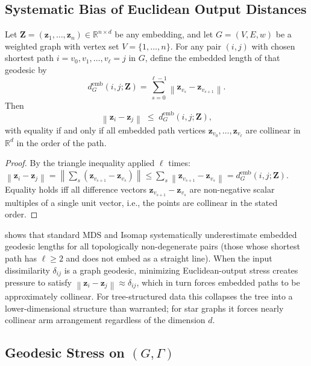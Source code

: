 \documentclass[twoside,11pt]{article}
\newcommand{\R}{\mathbb{R}}
\newcommand{\bz}{\mathbf{z}}
\newcommand{\bZ}{\mathbf{Z}}
\newcommand{\norm}[1]{\left\|#1\right\|}
\newcommand{\demb}{d^{\mathrm{emb}}}
\begin{document}
\subsection{Systematic Bias of Euclidean Output Distances}
\label{sec:systematic_bias}

\begin{proposition}
  \label{prop:bias}
  Let $\bZ = (\bz_1, \ldots, \bz_n) \in \R^{n \times d}$ be any embedding,
  and let $G = (V, E, w)$ be a weighted graph with vertex set $V = \{1,
  \ldots, n\}$.  For any pair $(i,j)$ with chosen shortest path
  $i = v_0, v_1, \ldots, v_\ell = j$ in $G$, define the embedded length of
  that geodesic by
  \begin{equation}
    \demb_G(i,j;\bZ)
    = \sum_{s=0}^{\ell-1} \norm{\bz_{v_s} - \bz_{v_{s+1}}}.
    \label{eq:emb_geo}
  \end{equation}
  Then
  \begin{equation}
    \norm{\bz_i - \bz_j} \;\leq\; \demb_G(i,j;\bZ),
    \label{eq:triangle_bias}
  \end{equation}
  with equality if and only if all embedded path vertices
  $\bz_{v_0}, \ldots, \bz_{v_\ell}$ are collinear in $\R^d$ in the order
  of the path.
\end{proposition}

\begin{proof}
  By the triangle inequality applied $\ell$ times:
  $\norm{\bz_i - \bz_j} = \norm{\sum_{s} (\bz_{v_{s+1}} - \bz_{v_s})}
  \leq \sum_s \norm{\bz_{v_{s+1}} - \bz_{v_s}} = \demb_G(i,j;\bZ)$.
  Equality holds iff all difference vectors $\bz_{v_{s+1}} - \bz_{v_s}$
  are non-negative scalar multiples of a single unit vector, i.e., the
  points are collinear in the stated order.
\end{proof}

 shows that standard MDS and Isomap systematically
underestimate embedded geodesic lengths for all topologically
non-degenerate pairs (those whose shortest path has $\ell \geq 2$ and
does not embed as a straight line).  When the input dissimilarity
$\delta_{ij}$ is a graph geodesic, minimizing Euclidean-output stress
creates pressure to satisfy $\norm{\bz_i - \bz_j} \approx \delta_{ij}$,
which in turn forces embedded paths to be approximately collinear.
For tree-structured data this collapses the tree into a lower-dimensional
structure than warranted; for star graphs it forces nearly collinear arm
arrangement regardless of the dimension $d$.

\subsection{Geodesic Stress on $(G,\Gamma)$}
\label{sec:geodesic_stress}
\end{document}
